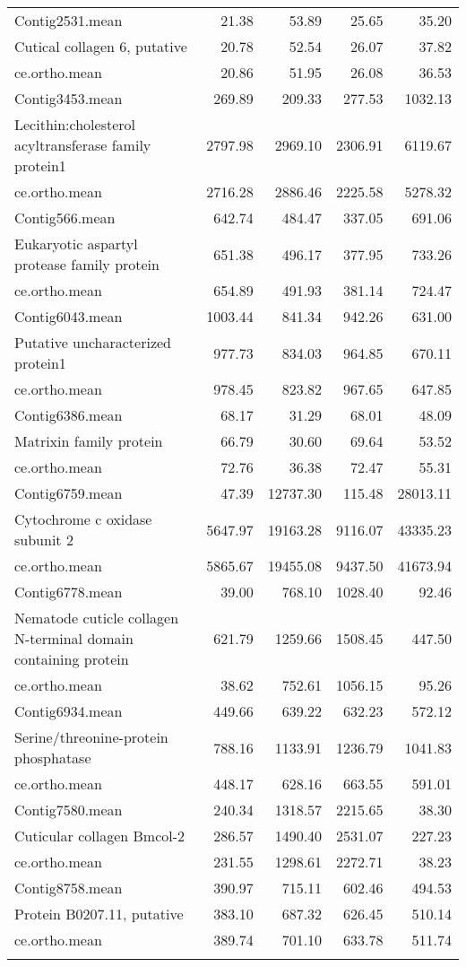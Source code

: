 \begin{longtable}{p{7cm}rrrr}
   \hline
Contig2531.mean & 21.38 & 53.89 & 25.65 & 35.20 \\ 
  Cutical collagen 6, putative & 20.78 & 52.54 & 26.07 & 37.82 \\ 
  ce.ortho.mean & 20.86 & 51.95 & 26.08 & 36.53 \\ 
   \hline
Contig3453.mean & 269.89 & 209.33 & 277.53 & 1032.13 \\ 
  Lecithin:cholesterol acyltransferase family protein1 & 2797.98 & 2969.10 & 2306.91 & 6119.67 \\ 
  ce.ortho.mean & 2716.28 & 2886.46 & 2225.58 & 5278.32 \\ 
   \hline
Contig566.mean & 642.74 & 484.47 & 337.05 & 691.06 \\ 
  Eukaryotic aspartyl protease family protein & 651.38 & 496.17 & 377.95 & 733.26 \\ 
  ce.ortho.mean & 654.89 & 491.93 & 381.14 & 724.47 \\ 
   \hline
Contig6043.mean & 1003.44 & 841.34 & 942.26 & 631.00 \\ 
  Putative uncharacterized protein1 & 977.73 & 834.03 & 964.85 & 670.11 \\ 
  ce.ortho.mean & 978.45 & 823.82 & 967.65 & 647.85 \\ 
   \hline
Contig6386.mean & 68.17 & 31.29 & 68.01 & 48.09 \\ 
  Matrixin family protein & 66.79 & 30.60 & 69.64 & 53.52 \\ 
  ce.ortho.mean & 72.76 & 36.38 & 72.47 & 55.31 \\ 
   \hline
Contig6759.mean & 47.39 & 12737.30 & 115.48 & 28013.11 \\ 
  Cytochrome c oxidase subunit 2 & 5647.97 & 19163.28 & 9116.07 & 43335.23 \\ 
  ce.ortho.mean & 5865.67 & 19455.08 & 9437.50 & 41673.94 \\ 
   \hline
Contig6778.mean & 39.00 & 768.10 & 1028.40 & 92.46 \\ 
  Nematode cuticle collagen N-terminal domain containing protein & 621.79 & 1259.66 & 1508.45 & 447.50 \\ 
  ce.ortho.mean & 38.62 & 752.61 & 1056.15 & 95.26 \\ 
   \hline
Contig6934.mean & 449.66 & 639.22 & 632.23 & 572.12 \\ 
  Serine/threonine-protein phosphatase & 788.16 & 1133.91 & 1236.79 & 1041.83 \\ 
  ce.ortho.mean & 448.17 & 628.16 & 663.55 & 591.01 \\ 
   \hline
Contig7580.mean & 240.34 & 1318.57 & 2215.65 & 38.30 \\ 
  Cuticular collagen Bmcol-2 & 286.57 & 1490.40 & 2531.07 & 227.23 \\ 
  ce.ortho.mean & 231.55 & 1298.61 & 2272.71 & 38.23 \\ 
   \hline
Contig8758.mean & 390.97 & 715.11 & 602.46 & 494.53 \\ 
  Protein B0207.11, putative & 383.10 & 687.32 & 626.45 & 510.14 \\ 
  ce.ortho.mean & 389.74 & 701.10 & 633.78 & 511.74 \\ 
   \hline\\
\end{longtable}


